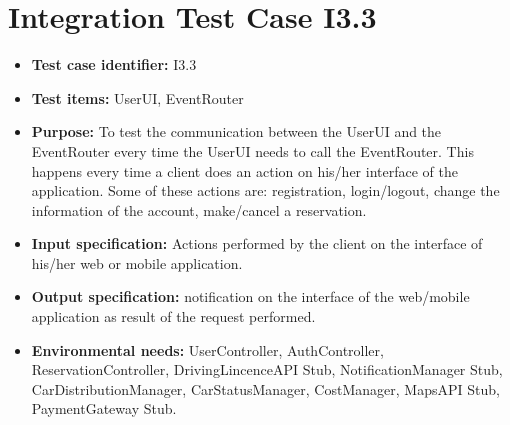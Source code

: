 \section{Integration Test Case I3.3}
\begin{itemize}
\item \textbf{Test case identifier:} I3.3
\item \textbf{Test items:} UserUI, EventRouter
\item \textbf{Purpose:} To test the communication between the UserUI and the EventRouter every time the UserUI needs to call the EventRouter. This happens every time a client does an action on his/her interface of the application. Some of these actions are: registration, login/logout, change the information of the account, make/cancel a reservation.
\item \textbf{Input specification:} Actions performed by the client on the interface of his/her web or mobile application.
\item \textbf{Output specification:} notification on the interface of the web/mobile application as result of the request performed.
\item \textbf{Environmental needs:} UserController, AuthController, ReservationController, DrivingLincenceAPI Stub, NotificationManager Stub, CarDistributionManager, CarStatusManager, CostManager, MapsAPI Stub, PaymentGateway Stub.
\end{itemize}
